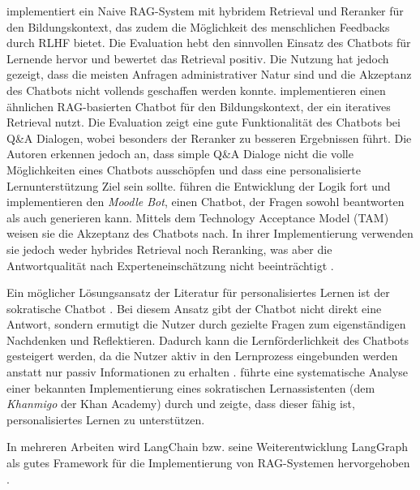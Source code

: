  implementiert ein Naive RAG-System mit hybridem Retrieval und Reranker für den Bildungskontext, das zudem die Möglichkeit des menschlichen Feedbacks durch RLHF bietet. Die Evaluation hebt den sinnvollen Einsatz des Chatbots für Lernende hervor und bewertet das Retrieval positiv. Die Nutzung hat jedoch gezeigt, dass die meisten Anfragen administrativer Natur sind und die Akzeptanz des Chatbots nicht vollends geschaffen werden konnte.  implementieren einen ähnlichen RAG-basierten Chatbot für den Bildungskontext, der ein iteratives Retrieval nutzt. Die Evaluation zeigt eine gute Funktionalität des Chatbots bei Q\&A Dialogen, wobei besonders der Reranker zu besseren Ergebnissen führt. Die Autoren erkennen jedoch an, dass simple Q\&A Dialoge nicht die volle Möglichkeiten eines Chatbots ausschöpfen und dass eine personalisierte Lernunterstützung Ziel sein sollte.  führen die Entwicklung der Logik fort und implementieren den \textit{Moodle Bot}, einen Chatbot, der Fragen sowohl beantworten als auch generieren kann. Mittels dem Technology Acceptance Model (TAM) weisen sie die Akzeptanz des Chatbots nach. In ihrer Implementierung verwenden sie jedoch weder hybrides Retrieval noch Reranking, was aber die Antwortqualität nach Experteneinschätzung nicht beeinträchtigt \cite{Neumann2024MoodleBot}.

Ein möglicher Lösungsansatz der Literatur für personalisiertes Lernen ist der sokratische Chatbot \cite{Socratic}. Bei diesem Ansatz gibt der Chatbot nicht direkt eine Antwort, sondern ermutigt die Nutzer durch gezielte Fragen zum eigenständigen Nachdenken und Reflektieren. Dadurch kann die Lernförderlichkeit des Chatbots gesteigert werden, da die Nutzer aktiv in den Lernprozess eingebunden werden anstatt nur passiv Informationen zu erhalten \cite{Socratic}.  führte eine systematische Analyse einer bekannten Implementierung eines sokratischen Lernassistenten (dem \textit{Khanmigo} der Khan Academy) durch und zeigte, dass dieser fähig ist, personalisiertes Lernen zu unterstützen.

In mehreren Arbeiten wird LangChain bzw. seine Weiterentwicklung LangGraph als gutes Framework für die Implementierung von RAG-Systemen hervorgehoben \cite{HybridUndMultihop1,BenchmarkRAG,ScalaBot6}.

